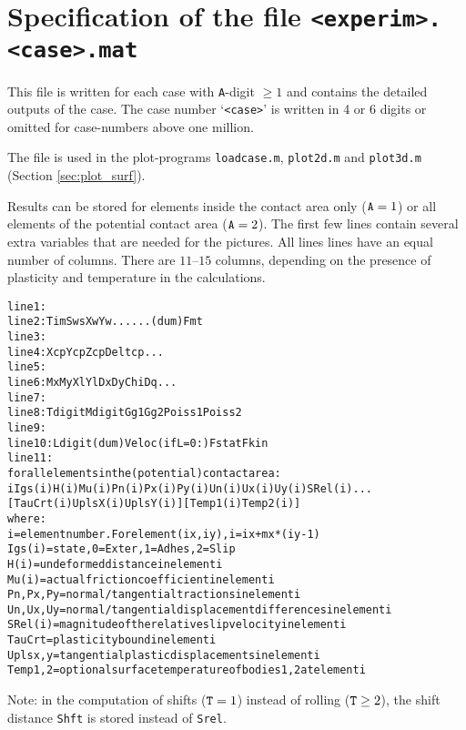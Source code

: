 \documentclass[12pt]{report}
\begin{document}
\section{Specification of the file {\tt <experim>.<case>.mat}}
\label{sec:spec_mat}

This file is written for each case with {\tt A}-digit $\ge 1$ and contains
the detailed outputs of the case. The case number `{\tt <case>}' is
written in 4 or 6 digits or omitted for case-numbers above one million.

The file is used in the plot-programs {\tt loadcase.m}, {\tt plot2d.m} and
{\tt plot3d.m} (Section \ref{sec:plot_surf}).

Results can be stored for elements inside the contact area only
(${\tt A}=1$) or all elements of the potential contact area (${\tt
A}=2$). The first few lines contain several extra variables that are needed
for the pictures. All lines lines have an equal number of columns. There
are $11\text{--}15$ columns, depending on the presence of plasticity and
temperature in the calculations.
\begin{alltt}\small
 line  1: % comment line, describing wheel and rail markers
 line  2:   Tim   Sws   Xw    Yw      ...                 ...   (dum)  Fmt
 line  3: % comment line, describing contact reference position
 line  4:   Xcp   Ycp   Zcp   Deltcp  ...
 line  5: % comment line, describing grid discretisation variables
 line  6:   Mx    My    Xl    Yl    Dx    Dy   Chi   Dq  ...
 line  7: % comment line, describing the material parameters used
 line  8:   Tdigit Mdigit Gg1    Gg2    Poiss1 Poiss2
 line  9: % comment line, describing the friction law used
 line 10:   Ldigit  (dum)  Veloc  (if L=0:) Fstat  Fkin
 line 11: % comment line, describing columns of the table
 for all elements in the (potential) contact area:
   i  Igs(i)  H(i)  Mu(i)  Pn(i)  Px(i)  Py(i)  Un(i)  Ux(i)  Uy(i)  SRel(i) ...
                            [ TauCrt(i) UplsX(i) UplsY(i) ] [ Temp1(i) Temp2(i)]
 where:
   i        = element number. For element (ix,iy), i = ix + mx*(iy-1)
   Igs(i)   = state, 0=Exter, 1=Adhes, 2=Slip
   H(i)     = undeformed distance in element i
   Mu(i)    = actual friction coefficient in element i
   Pn,Px,Py = normal/tangential tractions in element i
   Un,Ux,Uy = normal/tangential displacement differences in element i
   SRel(i)  = magnitude of the relative slip velocity in element i
   TauCrt   = plasticity bound in element i
   Uplsx,y  = tangential plastic displacements in element i
   Temp1,2  = optional surface temperature of bodies 1, 2 at element i
\end{alltt}
Note: in the computation of shifts (${\tt T}=1$) instead of rolling
(${\tt T}\ge 2$), the shift distance {\tt Shft} is stored instead of
{\tt Srel}.
\end{document}
